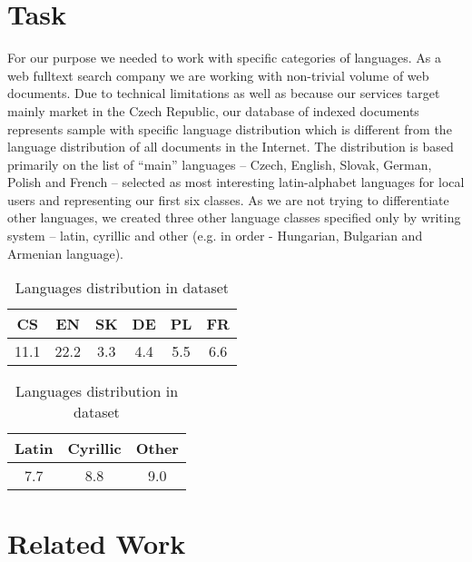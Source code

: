 \documentclass{acm_proc_article-sp}
\begin{document}
\section{Task}

  For our purpose we needed to work with specific categories of languages.
  As a web fulltext search company we are working with non-trivial volume of web documents.
  Due to technical limitations as well as because our services target mainly market in the Czech Republic,
  our database of indexed documents represents sample with specific language distribution which is different from the
  language distribution of all documents in the Internet.
  The distribution is based primarily on the list of “main” languages –
  Czech, English, Slovak, German, Polish and French –
  selected as most interesting latin-alphabet languages for local users and representing  our first six classes.
  As we are not trying to differentiate other languages, we created three other language classes specified only by writing system
  – latin, cyrillic and other (e.g. in order - Hungarian, Bulgarian and Armenian language).

  \begin{table}[]
 \centering
 \caption{Languages distribution in dataset}
 \label{langdist}
 \begin{tabular}{|c|c|c|c|c|c|} 
     \hline
 CS & EN & SK & DE & PL & FR  \\ \hline
 11.1 & 22.2 & 3.3 & 4.4 & 5.5 & 6.6 \\ \hline
 \end{tabular} 
 

 \begin{tabular}{|c|c|c|} 
     \hline
  Latin & Cyrillic & Other \\ \hline
 7.7 & 8.8 & 9.0 \\ \hline
 \end{tabular}
 
 \end{table}


\section{Related Work}
\end{document}
